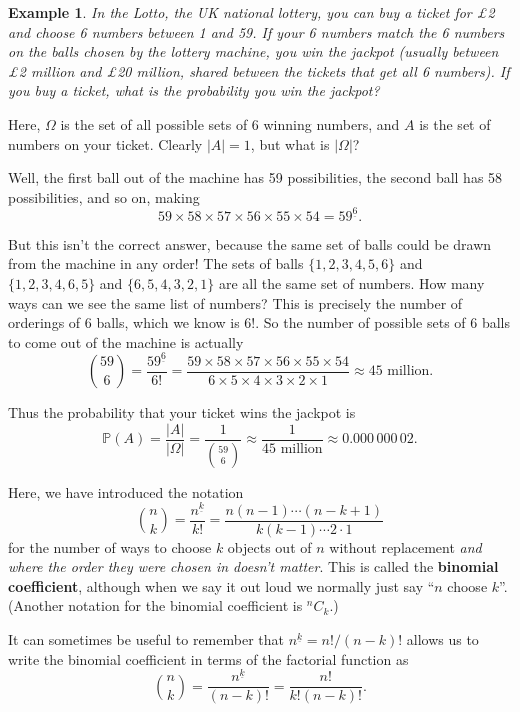 \documentclass[
  a4paper,
]{book}
\theoremstyle{definition}
\theoremstyle{definition}
\newtheorem{example}{Example}[chapter]
\theoremstyle{definition}
\theoremstyle{definition}
\theoremstyle{remark}
\begin{document}
\begin{example}
\protect\hypertarget{exm:lotto}{}\label{exm:lotto}\emph{In the Lotto, the UK national lottery, you can buy a ticket for £2 and choose 6 numbers between 1 and 59. If your 6 numbers match the 6 numbers on the balls chosen by the lottery machine, you win the jackpot (usually between £2 million and £20 million, shared between the tickets that get all 6 numbers). If you buy a ticket, what is the probability you win the jackpot?}

Here, \(\Omega\) is the set of all possible sets of 6 winning numbers, and \(A\) is the set of numbers on your ticket. Clearly \(|A| = 1\), but what is \(|\Omega|\)?

Well, the first ball out of the machine has 59 possibilities, the second ball has 58 possibilities, and so on, making
\[ 59 \times 58 \times 57 \times 56 \times 55 \times 54 = {59}^{\underline{6}} . \]

But this isn't the correct answer, because the same set of balls could be drawn from the machine in any order! The sets of balls \(\{1,2,3,4,5,6\}\) and \(\{1,2,3,4,6,5\}\) and \(\{6,5,4,3,2,1\}\) are all the same set of numbers. How many ways can we see the same list of numbers? This is precisely the number of orderings of 6 balls, which we know is \(6!\). So the number of possible sets of 6 balls to come out of the machine is actually
\[ \binom{59}{6} = \frac{{59}^{\underline{6}}}{6!} = \frac{59 \times 58 \times 57 \times 56 \times 55 \times 54}{6\times5\times4\times3\times2\times1} \approx 45 \text{ million} . \]

Thus the probability that your ticket wins the jackpot is
\[ \mathbb P(A) = \frac{|A|}{|\Omega|} = \frac{1}{\binom{59}{6}} \approx \frac{1}{45 \text{ million}} \approx 0.000\,000\,02 . \]
\end{example}

Here, we have introduced the notation
\[ \binom{n}{k} = \frac{{n}^{\underline{k}}}{k!} = \frac{n(n-1) \cdots (n-k+1)}{k(k-1)\cdots2\cdot1}  \]
for the number of ways to choose \(k\) objects out of \(n\) without replacement \emph{and where the order they were chosen in doesn't matter}. This is called the \textbf{binomial coefficient}, although when we say it out loud we normally just say ``\(n\) choose \(k\)''. (Another notation for the binomial coefficient is \({}^n C_k\).)

It can sometimes be useful to remember that \({n}^{\underline{k}} = n!/(n-k)!\) allows us to write the binomial coefficient in terms of the factorial function as
\[ \binom nk = \frac{{n}^{\underline{k}}}{(n-k)!} = \frac{n!}{k!(n-k)!} . \]
\end{document}
